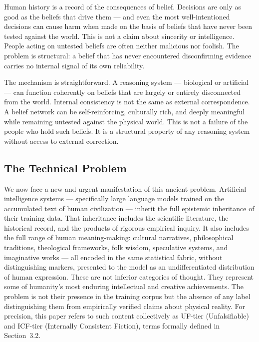 \documentclass[12pt]{article}
\begin{document}
Human history is a record of the consequences of belief. Decisions are
only as good as the beliefs that drive them --- and even the most
well-intentioned decisions can cause harm when made on the basis of
beliefs that have never been tested against the world. This is not a
claim about sincerity or intelligence. People acting on untested beliefs
are often neither malicious nor foolish. The problem is structural: a
belief that has never encountered disconfirming evidence carries no
internal signal of its own reliability.

The mechanism is straightforward. A reasoning system --- biological or
artificial --- can function coherently on beliefs that are largely or
entirely disconnected from the world. Internal consistency is not the
same as external correspondence. A belief network can be
self-reinforcing, culturally rich, and deeply meaningful while remaining
untested against the physical world. This is not a failure of the people
who hold such beliefs. It is a structural property of any reasoning
system without access to external correction.

\subsection{The Technical Problem}\label{the-technical-problem}

We now face a new and urgent manifestation of this ancient problem.
Artificial intelligence systems --- specifically large language models
trained on the accumulated text of human civilization --- inherit the
full epistemic inheritance of their training data. That inheritance
includes the scientific literature, the historical record, and the
products of rigorous empirical inquiry. It also includes the full range
of human meaning-making: cultural narratives, philosophical traditions,
theological frameworks, folk wisdom, speculative systems, and
imaginative works --- all encoded in the same statistical fabric,
without distinguishing markers, presented to the model as an
undifferentiated distribution of human expression. These are not
inferior categories of thought. They represent some of humanity's most
enduring intellectual and creative achievements. The problem is not
their presence in the training corpus but the absence of any label
distinguishing them from empirically verified claims about physical
reality. For precision, this paper refers to such content collectively
as UF-tier (Unfalsifiable) and ICF-tier (Internally Consistent Fiction),
terms formally defined in Section~3.2.
\end{document}

